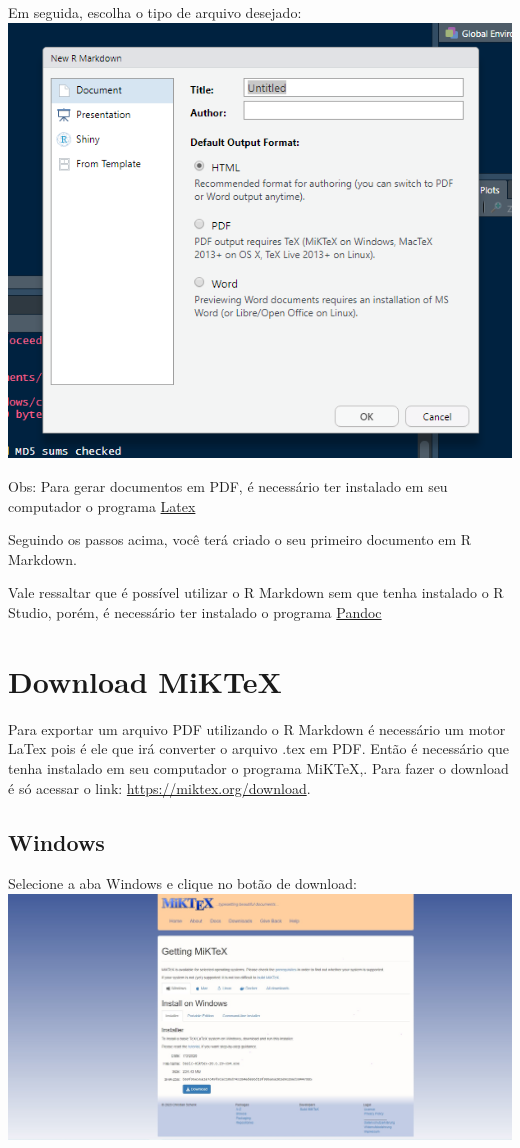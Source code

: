 \documentclass[
]{book}
\begin{document}
Em seguida, escolha o tipo de arquivo desejado:
\includegraphics{img/file.png}

Obs: Para gerar documentos em PDF, é necessário ter instalado em seu computador o programa \protect\hyperlink{download-rmd-e-latex}{Latex}

Seguindo os passos acima, você terá criado o seu primeiro documento em R Markdown.

Vale ressaltar que é possível utilizar o R Markdown sem que tenha instalado o R Studio, porém, é necessário ter instalado o programa \href{https://pandoc.org}{Pandoc}

\hypertarget{download-miktex}{%
\section{Download MiKTeX}\label{download-miktex}}

Para exportar um arquivo PDF utilizando o R Markdown é necessário um motor LaTex pois é ele que irá converter o arquivo .tex em PDF.
Então é necessário que tenha instalado em seu computador o programa MiKTeX,. Para fazer o download é só acessar o link: \url{https://miktex.org/download}.

\hypertarget{windows}{%
\subsection{Windows}\label{windows}}

Selecione a aba Windows e clique no botão de download:
\includegraphics{img/download_windowns_MiKTex.jpg}
\end{document}
